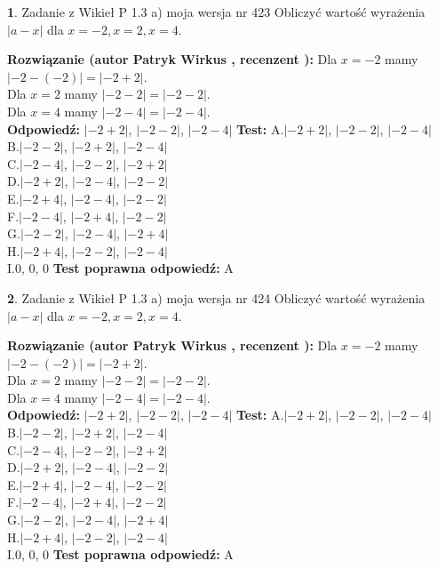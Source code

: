 \documentclass[12pt, a4paper]{article}
\theoremstyle{definition} %
\newtheorem{zad}{}
\newcommand{\zadStart}[1]{\begin{zad}#1\newline}
\newcommand{\zadStop}{\end{zad}}
\newcommand{\rozwStart}[2]{\noindent \textbf{Rozwiązanie (autor #1 , recenzent #2): }\newline}
\newcommand{\rozwStop}{\newline}
\newcommand{\odpStart}{\noindent \textbf{Odpowiedź:}\newline}
\newcommand{\odpStop}{\newline}
\newcommand{\testStart}{\noindent \textbf{Test:}\newline}
\newcommand{\testStop}{\newline}
\newcommand{\kluczStart}{\noindent \textbf{Test poprawna odpowiedź:}\newline}
\newcommand{\kluczStop}{\newline}
\begin{document}
\zadStart{Zadanie z Wikieł P 1.3 a) moja wersja nr 423}
Obliczyć wartość wyrażenia $|a - x|$ dla $x=-2,x=2,x=4$.
\zadStop
\rozwStart{Patryk Wirkus}{}
Dla $x = -2$ mamy $|-2 - (-2)| = |-2 + 2|$.\\
Dla $x = 2$ mamy $|-2 - 2| = |-2 - 2|$.\\
Dla $x = 4$ mamy $|-2 - 4| = |-2 - 4|$.\\
\rozwStop
\odpStart
$|-2 + 2|$, $|-2 - 2|$, $|-2 - 4|$
\odpStop
\testStart
A.$|-2 + 2|$, $|-2 - 2|$, $|-2 - 4|$\\
B.$|-2 - 2|$, $|-2 + 2|$, $|-2 - 4|$\\
C.$|-2 - 4|$, $|-2 - 2|$, $|-2 + 2|$\\
D.$|-2 + 2|$, $|-2 - 4|$, $|-2 - 2|$\\
E.$|-2 + 4|$, $|-2 - 4|$, $|-2 - 2|$\\
F.$|-2 - 4|$, $|-2 + 4|$, $|-2 - 2|$\\
G.$|-2 - 2|$, $|-2 - 4|$, $|-2 + 4|$\\
H.$|-2 + 4|$, $|-2 - 2|$, $|-2 - 4|$\\
I.$0$, $0$, $0$
\testStop
\kluczStart
A
\kluczStop



\zadStart{Zadanie z Wikieł P 1.3 a) moja wersja nr 424}
Obliczyć wartość wyrażenia $|a - x|$ dla $x=-2,x=2,x=4$.
\zadStop
\rozwStart{Patryk Wirkus}{}
Dla $x = -2$ mamy $|-2 - (-2)| = |-2 + 2|$.\\
Dla $x = 2$ mamy $|-2 - 2| = |-2 - 2|$.\\
Dla $x = 4$ mamy $|-2 - 4| = |-2 - 4|$.\\
\rozwStop
\odpStart
$|-2 + 2|$, $|-2 - 2|$, $|-2 - 4|$
\odpStop
\testStart
A.$|-2 + 2|$, $|-2 - 2|$, $|-2 - 4|$\\
B.$|-2 - 2|$, $|-2 + 2|$, $|-2 - 4|$\\
C.$|-2 - 4|$, $|-2 - 2|$, $|-2 + 2|$\\
D.$|-2 + 2|$, $|-2 - 4|$, $|-2 - 2|$\\
E.$|-2 + 4|$, $|-2 - 4|$, $|-2 - 2|$\\
F.$|-2 - 4|$, $|-2 + 4|$, $|-2 - 2|$\\
G.$|-2 - 2|$, $|-2 - 4|$, $|-2 + 4|$\\
H.$|-2 + 4|$, $|-2 - 2|$, $|-2 - 4|$\\
I.$0$, $0$, $0$
\testStop
\kluczStart
A
\kluczStop
\end{document}

